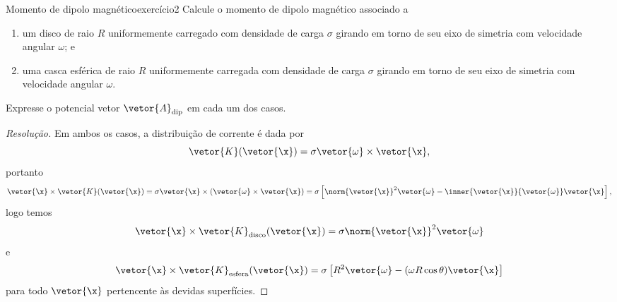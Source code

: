 \begin{exercício}{Momento de dipolo magnético}{exercício2}
    Calcule o momento de dipolo magnético associado a
    \begin{enumerate}[label=(\alph*)]
        \item um disco de raio \(R\) uniformemente carregado com densidade de carga \(\sigma\) girando em torno de seu eixo de simetria com velocidade angular \(\omega\); e
        \item uma casca esférica de raio \(R\) uniformemente carregada com densidade de carga \(\sigma\) girando em torno de seu eixo de simetria com velocidade angular \(\omega\).
    \end{enumerate}
    Expresse o potencial vetor \(\vetor{A}_\mathrm{dip}\) em cada um dos casos.
\end{exercício}
\begin{proof}[Resolução]
    Em ambos os casos, a distribuição de corrente é dada por
    \begin{equation*}
        \vetor{K}(\vetor{\x}) = \sigma \vetor{\omega} \times \vetor{\x},
    \end{equation*}
    portanto
    \begin{equation*}
        \vetor{\x} \times \vetor{K}(\vetor{\x}) = \sigma \vetor{\x} \times (\vetor{\omega} \times \vetor{\x}) = \sigma \left[\norm{\vetor{\x}}^2 \vetor{\omega} - \inner{\vetor{\x}}{\vetor{\omega}}\vetor{\x}\right],
    \end{equation*}
    logo temos
    \begin{equation*}
        \vetor{\x} \times \vetor{K}_\mathrm{disco}(\vetor{\x}) = \sigma \norm{\vetor{\x}}^2 \vetor{\omega}
    \end{equation*}
    e
    \begin{equation*}
        \vetor{\x} \times \vetor{K}_\mathrm{esfera}(\vetor{\x}) = \sigma \left[R^2 \vetor{\omega} - (\omega R \cos\theta) \vetor{\x}\right]
    \end{equation*}
    para todo \(\vetor{\x}\) pertencente às devidas superfícies.


\end{proof}
